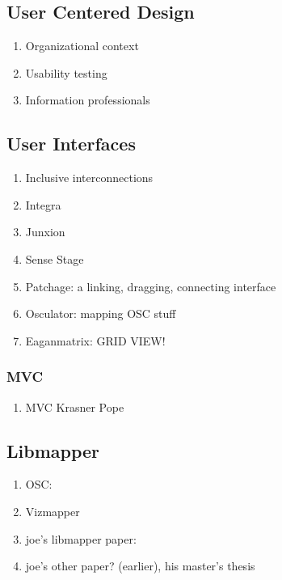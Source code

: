 \subsection{User Centered Design}
	\begin{enumerate}
		\item Organizational context 
		\item Usability testing 
		\item Information professionals 
	\end{enumerate}

\subsection{User Interfaces}
	\begin{enumerate}
		\item Inclusive interconnections 
		\item Integra 
		\item Junxion 
		\item Sense Stage 
		\item Patchage: a linking, dragging, connecting interface 
		\item Osculator: mapping OSC stuff 
		\item Eaganmatrix: GRID VIEW! 
	\end{enumerate}
		\subsubsection{MVC}
			\begin{enumerate}
				\item MVC Krasner Pope 
			\end{enumerate}

\subsection{Libmapper}
	\begin{enumerate}
		\item OSC: 
		\item Vizmapper 
		\item joe's libmapper paper: 
		\item joe's other paper? (earlier), his master's thesis
	\end{enumerate}
